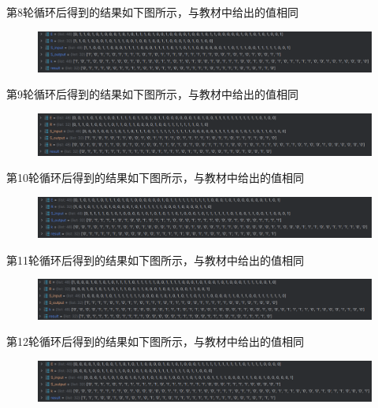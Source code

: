 \documentclass[a4paper,11pt,UTF8]{ctexart}
\newcommand{\bottomcaption}{%
\setlength{\abovecaptionskip}{6pt}%
\setlength{\belowcaptionskip}{6pt}%
\caption}
\newcommand{\xiaowuhao}{\fontsize{9pt}{\baselineskip}\selectfont}   %
\begin{document}
            第8轮循环后得到的结果如下图所示，与教材中给出的值相同
            \begin{figure}[H]
                \centering
                \includegraphics[width=15cm]{N8.png}
                \bottomcaption{\xiaowuhao{第8轮循环的结果}}
            \end{figure}
            第9轮循环后得到的结果如下图所示，与教材中给出的值相同
            \begin{figure}[H]
                \centering
                \includegraphics[width=15cm]{N9.png}
                \bottomcaption{\xiaowuhao{第9轮循环的结果}}
            \end{figure}
            第10轮循环后得到的结果如下图所示，与教材中给出的值相同
            \begin{figure}[H]
                \centering
                \includegraphics[width=15cm]{N10.png}
                \bottomcaption{\xiaowuhao{第10轮循环的结果}}
            \end{figure}
            第11轮循环后得到的结果如下图所示，与教材中给出的值相同
            \begin{figure}[H]
                \centering
                \includegraphics[width=15cm]{N11.png}
                \bottomcaption{\xiaowuhao{第11轮循环的结果}}
            \end{figure}
            第12轮循环后得到的结果如下图所示，与教材中给出的值相同
            \begin{figure}[H]
                \centering
                \includegraphics[width=15cm]{N12.png}
                \bottomcaption{\xiaowuhao{第12轮循环的结果}}
            \end{figure}
\end{document}

